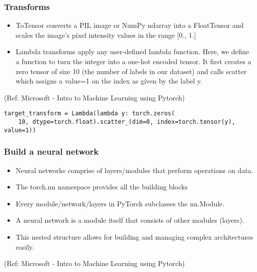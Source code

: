 \begin{frame}[fragile] \frametitle{Transforms}


\begin{itemize}
\item ToTensor converts a PIL image or NumPy ndarray into a FloatTensor and scales the image's pixel intensity values in the range [0., 1.]
\item Lambda transforms apply any user-defined lambda function. Here, we define a function to turn the integer into a one-hot encoded tensor. It first creates a zero tensor of size 10 (the number of labels in our dataset) and calls scatter which assigns a value=1 on the index as given by the label y.
\end{itemize}

\tiny{(Ref: Microsoft - Intro to Machine Learning using Pytorch)}

\begin{lstlisting}
target_transform = Lambda(lambda y: torch.zeros(
    10, dtype=torch.float).scatter_(dim=0, index=torch.tensor(y), value=1))
\end{lstlisting}

\end{frame}

\begin{frame}[fragile] \frametitle{Build a neural network}

\begin{itemize}
\item Neural networks comprise of layers/modules that perform operations on data. 
\item The torch.nn namespace provides all the building blocks 
\item Every module/network/layers in PyTorch subclasses the nn.Module. 
\item A neural network is a module itself that consists of other modules (layers). 
\item This nested structure allows for building and managing complex architectures easily.
\end{itemize}


\tiny{(Ref: Microsoft - Intro to Machine Learning using Pytorch)}
\end{frame}


